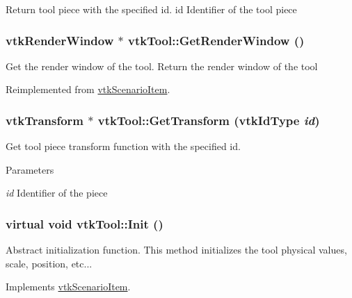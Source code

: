 Return tool piece with the specified id. id Identifier of the tool piece \hypertarget{classvtkTool_ab156b5e1d4a9974b6b4a9809fdb10dc1}{
\subsubsection[{GetRenderWindow}]{\setlength{\rightskip}{0pt plus 5cm}vtkRenderWindow $\ast$ vtkTool::GetRenderWindow ()}}
\label{classvtkTool_ab156b5e1d4a9974b6b4a9809fdb10dc1}


Get the render window of the tool. Return the render window of the tool 

Reimplemented from \hyperlink{classvtkScenarioItem_a9d7908b11d2a477827342c05bb505e66}{vtkScenarioItem}.\hypertarget{classvtkTool_aa7c8e40f5216213e56cc7307bd16460a}{
\subsubsection[{GetTransform}]{\setlength{\rightskip}{0pt plus 5cm}vtkTransform $\ast$ vtkTool::GetTransform (vtkIdType {\em id})}}
\label{classvtkTool_aa7c8e40f5216213e56cc7307bd16460a}


Get tool piece transform function with the specified id. 
\begin{DoxyParams}{Parameters}
\item[{\em id}]Identifier of the piece \end{DoxyParams}
\hypertarget{classvtkTool_a6b9e7743cde1b61b252abef17248a913}{
\subsubsection[{Init}]{\setlength{\rightskip}{0pt plus 5cm}virtual void vtkTool::Init ()}}
\label{classvtkTool_a6b9e7743cde1b61b252abef17248a913}


Abstract initialization function. This method initializes the tool physical values, scale, position, etc... 

Implements \hyperlink{classvtkScenarioItem_a87f01894de62f23433aa2eb3f995c216}{vtkScenarioItem}.

